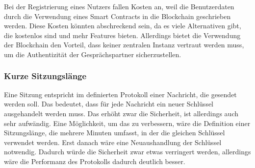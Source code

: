 Bei der Registrierung eines Nutzers fallen Kosten an, weil die Benutzerdaten durch die Verwendung eines Smart Contracts in die Blockchain geschrieben werden. Diese Kosten könnten abschreckend sein, da es viele Alternativen gibt, die kostenlos sind und mehr Features bieten. Allerdings bietet die Verwendung der Blockchain den Vorteil, dass keiner zentralen Instanz vertraut werden muss, um die Authentizität der Gesprächspartner sicherzustellen.


\subsubsection{Kurze Sitzungslänge}

Eine Sitzung entspricht im definierten Protokoll einer Nachricht, die gesendet werden soll. Das bedeutet, dass für jede Nachricht ein neuer Schlüssel ausgehandelt werden muss. Das erhöht zwar die Sicherheit, ist allerdings auch sehr aufwändig. Eine Möglichkeit, um das zu verbessern, wäre die Definition einer Sitzungslänge, die mehrere Minuten umfasst, in der die gleichen Schlüssel verwendet werden. Erst danach wäre eine Neuaushandlung der Schlüssel notwendig. Dadurch würde die Sicherheit zwar etwas verringert werden, allerdings wäre die Performanz des Protokolls dadurch deutlich besser.

